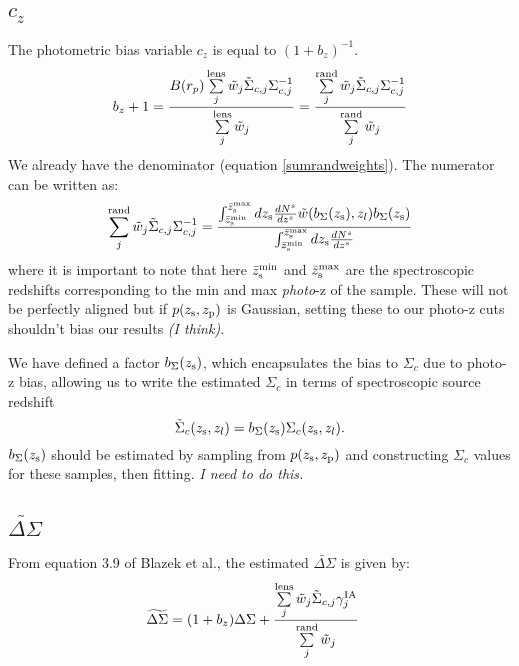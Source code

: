 \documentclass[onecolumn,amsmath,aps,fleqn, superscriptaddress]{revtex4}
\begin{document}
\subsection{$c_z$}

The photometric bias variable $c_z$ is equal to $(1+b_z)^{-1}$.
\begin{equation}
b_z+1 = \frac{B(r_p) \sum\limits^{\rm lens}_{j} \tilde{w}_j \tilde{\Sigma}_{c,j} \Sigma_{c,j}^{-1}}{\sum\limits^{\rm lens}_{j} \tilde{w}_j} = \frac{\sum\limits^{\rm rand}_{j} \tilde{w}_j \tilde{\Sigma}_{c,j} \Sigma_{c,j}^{-1}}{\sum\limits^{\rm rand}_{j} \tilde{w}_j}
\label{photozbias}
\end{equation}
We already have the denominator (equation \ref{sumrandweights}). The numerator can be written as:
\begin{equation}
\sum\limits^{\rm rand}_{j} \tilde{w}_j \tilde{\Sigma}_{c,j} \Sigma_{c,j}^{-1}  = \frac{\int_{\bar{z}_{\rm s}^{\rm min}}^{\bar{z}_{\rm s}^{\rm max}}dz_{\rm s} \frac{dN^s}{dz^s} \tilde{w}(b_{\Sigma}(z_{\rm s}), z_l) b_\Sigma(z_{\rm s})}{ \int_{\bar{z}_{\rm s}^{\rm min}}^{\bar{z}_{\rm s}^{\rm max}}dz_{\rm s} \frac{dN^s}{dz^s}}
\label{photoz}
\end{equation}
where it is important to note that here $\bar{z}_{\rm s}^{\rm min}$ and $\bar{z}_{\rm s}^{\rm max}$ are the spectroscopic redshifts corresponding to the min and max {\it photo}-z of the sample. These will not be perfectly aligned but if $p(z_{\rm s}, z_{\rm p})$ is Gaussian, setting these to our photo-z cuts shouldn't bias our results {\it (I think)}. 

We have defined a factor $b_{\Sigma}(z_{\rm s})$, which encapsulates the bias to $\Sigma_c$ due to photo-z bias, allowing us to write the estimated $\Sigma_c$ in terms of spectroscopic source redshift 
\begin{equation}
\tilde{\Sigma}_c(z_{\rm s}, z_l) = b_\Sigma(z_{\rm s}) \Sigma_c(z_{\rm s}, z_l).
\label{bsig}
\end{equation}
$b_\Sigma(z_{\rm s})$ should be estimated by sampling from $p(z_{\rm s}, z_{\rm p})$ and constructing $\Sigma_c$ values for these samples, then fitting. {\it I need to do this.}

\subsection{$\widetilde{\Delta \Sigma}$}
From equation 3.9 of Blazek et al., the estimated $\widetilde{\Delta \Sigma}$ is given by:
\begin{align}
\widetilde{\Delta \Sigma}&= (1+b_z) \Delta \Sigma + \frac{\sum\limits_{j}^{\rm lens} \tilde{w}_j \tilde{\Sigma}_{c,j} \gamma^{\rm IA}_j }{\sum\limits_{j}^{\rm rand} \tilde{w}_j} 
\label{deltasigma}
\end{align}
\end{document}

